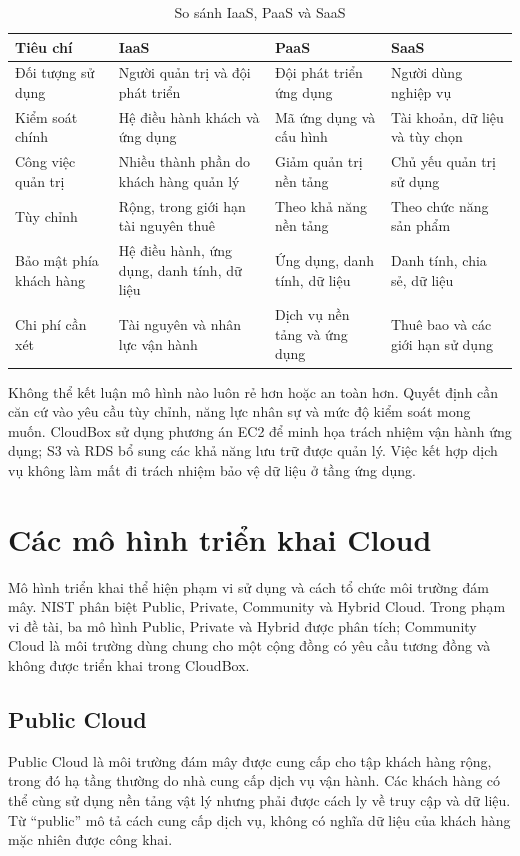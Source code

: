 \begin{table}[htbp]
\centering\small
\caption{So sánh IaaS, PaaS và SaaS}
\begin{tabularx}{\textwidth}{@{}>{\raggedright\arraybackslash}p{2.2cm}XXX@{}}
\toprule
\textbf{Tiêu chí} & \textbf{IaaS} & \textbf{PaaS} & \textbf{SaaS} \\
\midrule
Đối tượng sử dụng & Người quản trị và đội phát triển & Đội phát triển ứng dụng & Người dùng nghiệp vụ \\
Kiểm soát chính & Hệ điều hành khách và ứng dụng & Mã ứng dụng và cấu hình & Tài khoản, dữ liệu và tùy chọn \\
Công việc quản trị & Nhiều thành phần do khách hàng quản lý & Giảm quản trị nền tảng & Chủ yếu quản trị sử dụng \\
Tùy chỉnh & Rộng, trong giới hạn tài nguyên thuê & Theo khả năng nền tảng & Theo chức năng sản phẩm \\
Bảo mật phía khách hàng & Hệ điều hành, ứng dụng, danh tính, dữ liệu & Ứng dụng, danh tính, dữ liệu & Danh tính, chia sẻ, dữ liệu \\
Chi phí cần xét & Tài nguyên và nhân lực vận hành & Dịch vụ nền tảng và ứng dụng & Thuê bao và các giới hạn sử dụng \\
\bottomrule
\end{tabularx}
\end{table}

Không thể kết luận mô hình nào luôn rẻ hơn hoặc an toàn hơn. Quyết định cần căn cứ vào yêu cầu tùy chỉnh, năng lực nhân sự và mức độ kiểm soát mong muốn. CloudBox sử dụng phương án EC2 để minh họa trách nhiệm vận hành ứng dụng; S3 và RDS bổ sung các khả năng lưu trữ được quản lý. Việc kết hợp dịch vụ không làm mất đi trách nhiệm bảo vệ dữ liệu ở tầng ứng dụng.

\section{Các mô hình triển khai Cloud}
Mô hình triển khai thể hiện phạm vi sử dụng và cách tổ chức môi trường đám mây. NIST phân biệt Public, Private, Community và Hybrid Cloud. Trong phạm vi đề tài, ba mô hình Public, Private và Hybrid được phân tích; Community Cloud là môi trường dùng chung cho một cộng đồng có yêu cầu tương đồng và không được triển khai trong CloudBox.\cite{nistcloud}

\subsection{Public Cloud}
Public Cloud là môi trường đám mây được cung cấp cho tập khách hàng rộng, trong đó hạ tầng thường do nhà cung cấp dịch vụ vận hành. Các khách hàng có thể cùng sử dụng nền tảng vật lý nhưng phải được cách ly về truy cập và dữ liệu. Từ ``public'' mô tả cách cung cấp dịch vụ, không có nghĩa dữ liệu của khách hàng mặc nhiên được công khai.


